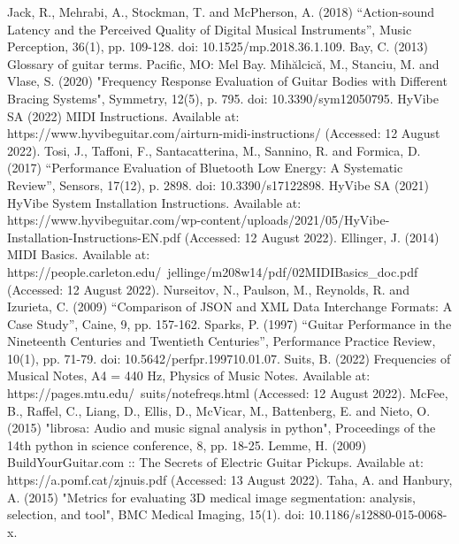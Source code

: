 \documentclass[conference]{IEEEtran}
\begin{document}
\begin{thebibliography}{00}
\bibitem{} Jack, R., Mehrabi, A., Stockman, T. and McPherson, A. (2018) ``Action-sound Latency and the Perceived Quality of Digital Musical Instruments'', Music Perception, 36(1), pp. 109-128. doi: 10.1525/mp.2018.36.1.109.
\bibitem{} Bay, C. (2013) Glossary of guitar terms. Pacific, MO: Mel Bay.
\bibitem Mihălcică, M., Stanciu, M. and Vlase, S. (2020) "Frequency Response Evaluation of Guitar Bodies with Different Bracing Systems", Symmetry, 12(5), p. 795. doi: 10.3390/sym12050795.
\bibitem{} HyVibe SA (2022) MIDI Instructions. Available at: https://www.hyvibeguitar.com/airturn-midi-instructions/ (Accessed: 12 August 2022).
\bibitem{} Tosi, J., Taffoni, F., Santacatterina, M., Sannino, R. and Formica, D. (2017) ``Performance Evaluation of Bluetooth Low Energy: A Systematic Review'', Sensors, 17(12), p. 2898. doi: 10.3390/s17122898.
\bibitem{} HyVibe SA (2021) HyVibe System Installation Instructions. Available at: https://www.hyvibeguitar.com/wp-content/uploads/2021/05/HyVibe-Installation-Instructions-EN.pdf (Accessed: 12 August 2022).
\bibitem{} Ellinger, J. (2014) MIDI Basics. Available at: https://people.carleton.edu/~jellinge/m208w14/pdf/02MIDIBasics\_doc.pdf (Accessed: 12 August 2022).
\bibitem{} Nurseitov, N., Paulson, M., Reynolds, R. and Izurieta, C. (2009) ``Comparison of JSON and XML Data Interchange Formats: A Case Study'', Caine, 9, pp. 157-162.
\bibitem{} Sparks, P. (1997) ``Guitar Performance in the Nineteenth Centuries and Twentieth Centuries'', Performance Practice Review, 10(1), pp. 71-79. doi: 10.5642/perfpr.199710.01.07.
\bibitem{} Suits, B. (2022) Frequencies of Musical Notes, A4 = 440 Hz, Physics of Music Notes. Available at: https://pages.mtu.edu/~suits/notefreqs.html (Accessed: 12 August 2022).
\bibitem{} McFee, B., Raffel, C., Liang, D., Ellis, D., McVicar, M., Battenberg, E. and Nieto, O. (2015) "librosa: Audio and music signal analysis in python", Proceedings of the 14th python in science conference, 8, pp. 18-25. 
\bibitem{} Lemme, H. (2009) BuildYourGuitar.com :: The Secrets of Electric Guitar Pickups. Available at: https://a.pomf.cat/zjnuis.pdf (Accessed: 13 August 2022).
\bibitem{} Taha, A. and Hanbury, A. (2015) "Metrics for evaluating 3D medical image segmentation: analysis, selection, and tool", BMC Medical Imaging, 15(1). doi: 10.1186/s12880-015-0068-x.

\end{thebibliography}
\vspace{12pt}
\end{document}
